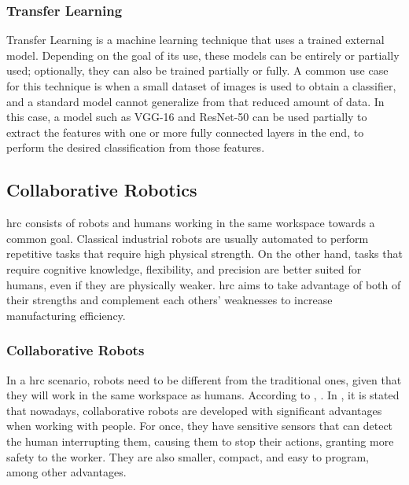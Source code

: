 \subsubsection{Transfer Learning}

Transfer Learning is a machine learning technique that uses a trained external model. Depending on the goal of its use, these models can be entirely or partially used; optionally, they can also be trained partially or fully. A common use case for this technique is when a small dataset of images is used to obtain a classifier, and a standard model cannot generalize from that reduced amount of data. In this case, a model such as VGG-16 and ResNet-50 can be used partially to extract the features with one or more fully connected layers in the end, to perform the desired classification from those features.

\subsection{Collaborative Robotics}
\label{subsection:collaborative_robotics}

\acf{hrc} consists of robots and humans working in the same workspace towards a common goal. Classical industrial robots are usually automated to perform repetitive tasks that require high physical strength. On the other hand, tasks that require cognitive knowledge, flexibility, and precision are better suited for humans, even if they are physically weaker. \acs{hrc} aims to take advantage of both of their strengths and complement each others' weaknesses to increase manufacturing efficiency.

\subsubsection{Collaborative Robots}

In a \acs{hrc} scenario, robots need to be different from the traditional ones, given that they will work in the same workspace as humans. According to \textcite{Castro2021}, . In \cite{CobotsWW}, it is stated that nowadays, collaborative robots are developed with significant advantages when working with people. For once, they have sensitive sensors that can detect the human interrupting them, causing them to stop their actions, granting more safety to the worker. They are also smaller, compact, and easy to program, among other advantages.

